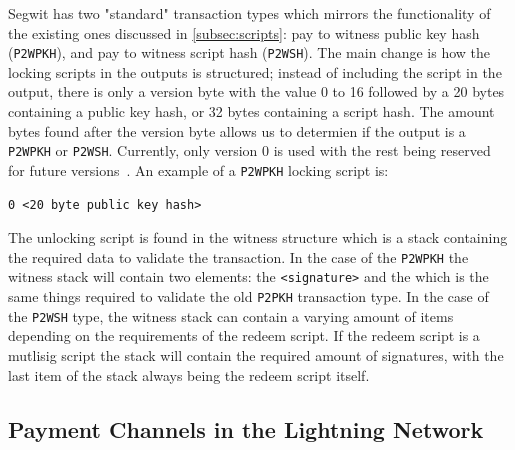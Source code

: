 Segwit has two "standard" transaction types which mirrors the functionality of the existing ones discussed in \cref{subsec:scripts}: pay to witness public key hash ({\tt P2WPKH}), and pay to witness script hash ({\tt P2WSH}). The main change is how the locking scripts in the outputs is structured; instead of including the script in the output, there is only a version byte with the value 0 to 16 followed by a 20 bytes containing a public key hash, or 32 bytes containing a script hash. The amount bytes found after the version byte allows us to determien if the output is a {\tt P2WPKH} or {\tt P2WSH}. Currently, only version 0 is used with the rest being reserved for future versions~\cite{BIP141}. An example of a {\tt P2WPKH} locking script is:

\begin{verbatim}
0 <20 byte public key hash>
\end{verbatim}

The unlocking script is found in the witness structure which is a stack containing the required data to validate the transaction.
In the case of the {\tt P2WPKH} the witness stack will contain two elements: the {\tt <signature>} and the {\tt <public key>} which is the same things required to validate the old {\tt P2PKH} transaction type. In the case of the {\tt P2WSH} type, the witness stack can contain a varying amount of items depending on the requirements of the redeem script. If the redeem script is a mutlisig script the stack will contain the required amount of signatures, with the last item of the stack always being the redeem script itself.

\subsection{Payment Channels in the Lightning Network} 
\label{subsec:pcln}

